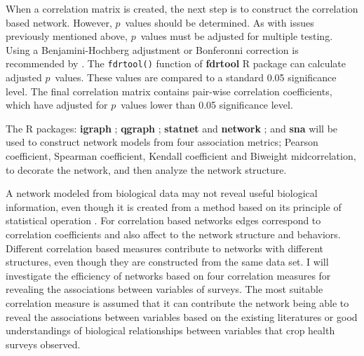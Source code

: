 When a correlation matrix is created, the next step is to construct the correlation based network. However, $p$~values should be determined. As with issues previously mentioned above, $p$~values must be adjusted for multiple testing. Using a Benjamini-Hochberg adjustment or Bonferonni correction is recommended by . The \texttt{fdrtool()} function of \textbf{fdrtool} R package can calculate adjusted $p$~values. These values are compared to a standard 0.05 significance level. The final correlation matrix contains pair-wise correlation coefficients, which have adjusted for $p$~values lower than 0.05 significance level.

The R packages: \textbf{igraph} ; \textbf{qgraph} ; \textbf{statnet}  and \textbf{network} ; and \textbf{sna}  will be used to construct network models from four association metrics; Pearson coefficient, Spearman coefficient, Kendall coefficient and Biweight midcorrelation, to decorate the network, and then analyze the network structure.

A network modeled from biological data may not reveal useful biological information, even though it is created from a method based on its principle of statistical operation . For correlation based networks edges correspond to correlation coefficients and also affect to the network structure and behaviors. Different correlation based measures contribute to networks with different structures, even though they are constructed from the same data set. I will investigate the efficiency of networks based on four correlation measures for revealing the associations between variables of surveys. The most suitable correlation measure is assumed that it can contribute the network being able to reveal the associations between variables based on the existing literatures or good understandings of biological relationships between variables that crop health surveys observed.


